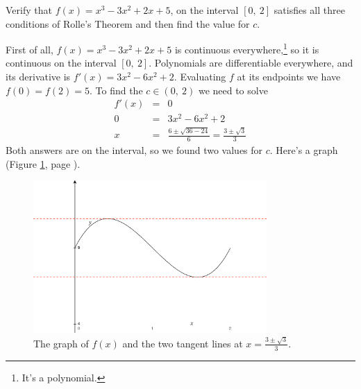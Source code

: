 \documentclass[12pt,addpoints, answers, fleqn]{exam}
\begin{document}
\begin{questions}
\question Verify that $f\left( x \right) = x^3 - 3x^2 + 2x +5$, on the interval $\left[ 0, \ 2 \right]$ satisfies all three conditions of  Rolle's Theorem and then find the value for $c$.

\begin{solution}
First of all, $f\left( x \right) = x^3 - 3x^2 + 2x +5$ is continuous everywhere,\footnote{It's a polynomial.} so it is continuous on the interval $\left[ 0, \ 2 \right]$. Polynomials are differentiable everywhere, and its derivative is  $f'\left( x \right) = 3x^2 - 6x^2 + 2$. Evaluating $f$ at its endpoints we have $f\left( 0 \right) = f\left( 2 \right) = 5$. To find the $c \in \left( 0, \ 2 \right)$ we need to solve
\begin{eqnarray*}
f'\left( x \right) & = & 0\\
 0 &=& 3x^2 - 6x^2 + 2\\
 x &=& \frac{6 \pm \sqrt{36 - 24}}{6} = \frac{3 \pm \sqrt{3}}{3}
\end{eqnarray*}
Both answers are on the interval, so we found two values for $c$. Here's a graph (Figure \ref{fig:graph2103}, page \pageref{fig:graph2103}).
\end{solution}

\begin{figure}[htbp] %
   \centering
   \includegraphics[width=3.5in]{./graphics/graph2103.pdf} 
   \caption{The graph of $f\left( x \right)$ and the two tangent lines at $x = \displaystyle \frac{3 \pm \sqrt{3}}{3}$.}
   \label{fig:graph2103}
\end{figure}





\end{questions}
\end{document}

